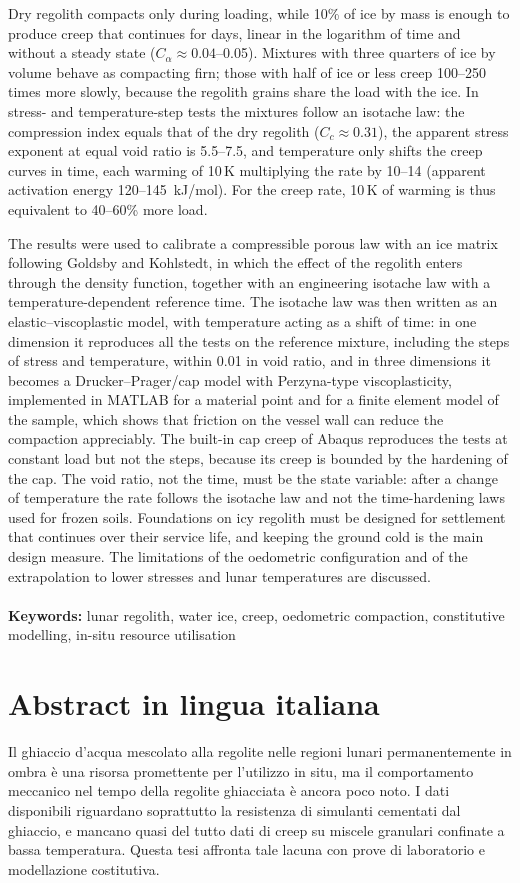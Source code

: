 \documentclass{Configuration_Files/PoliMi3i_thesis}
\begin{document}
Dry regolith compacts only during loading, while 10\% of ice by mass is enough to produce creep that continues for days, linear in the logarithm of time and without a steady state ($C_\alpha\approx0.04$--0.05). Mixtures with three quarters of ice by volume behave as compacting firn; those with half of ice or less creep 100--250 times more slowly, because the regolith grains share the load with the ice. In stress- and temperature-step tests the mixtures follow an isotache law: the compression index equals that of the dry regolith ($C_c\approx0.31$), the apparent stress exponent at equal void ratio is 5.5--7.5, and temperature only shifts the creep curves in time, each warming of 10\,K multiplying the rate by 10--14 (apparent activation energy 120--145~kJ/mol). For the creep rate, 10\,K of warming is thus equivalent to 40--60\% more load.

The results were used to calibrate a compressible porous law with an ice matrix following Goldsby and Kohlstedt, in which the effect of the regolith enters through the density function, together with an engineering isotache law with a temperature-dependent reference time. The isotache law was then written as an elastic--viscoplastic model, with temperature acting as a shift of time: in one dimension it reproduces all the tests on the reference mixture, including the steps of stress and temperature, within 0.01 in void ratio, and in three dimensions it becomes a Drucker--Prager/cap model with Perzyna-type viscoplasticity, implemented in MATLAB for a material point and for a finite element model of the sample, which shows that friction on the vessel wall can reduce the compaction appreciably. The built-in cap creep of Abaqus reproduces the tests at constant load but not the steps, because its creep is bounded by the hardening of the cap. The void ratio, not the time, must be the state variable: after a change of temperature the rate follows the isotache law and not the time-hardening laws used for frozen soils. Foundations on icy regolith must be designed for settlement that continues over their service life, and keeping the ground cold is the main design measure. The limitations of the oedometric configuration and of the extrapolation to lower stresses and lunar temperatures are discussed.
\\
\\
\textbf{Keywords:} lunar regolith, water ice, creep, oedometric compaction, constitutive modelling, in-situ resource utilisation %

\chapter*{Abstract in lingua italiana}
Il ghiaccio d'acqua mescolato alla regolite nelle regioni lunari permanentemente in ombra è una risorsa promettente per l'utilizzo in situ, ma il comportamento meccanico nel tempo della regolite ghiacciata è ancora poco noto. I dati disponibili riguardano soprattutto la resistenza di simulanti cementati dal ghiaccio, e mancano quasi del tutto dati di creep su miscele granulari confinate a bassa temperatura. Questa tesi affronta tale lacuna con prove di laboratorio e modellazione costitutiva.
\end{document}
